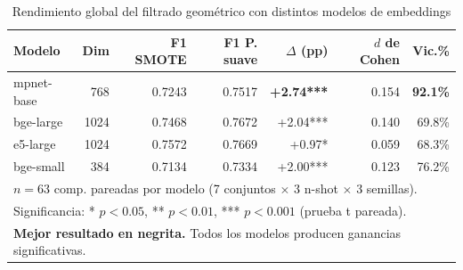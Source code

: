 \begin{table}[htbp]
\centering
\caption{Rendimiento global del filtrado geométrico con distintos modelos de embeddings}
\label{tab:embedding_overall}
\small
\begin{tabular}{lrrrrrr}
\toprule
\textbf{Modelo} & \textbf{Dim} & \textbf{F1 SMOTE} & \textbf{F1 P. suave} & \textbf{$\Delta$ (pp)} & \textbf{$d$ de Cohen} & \textbf{Vic.\%} \\
\midrule
mpnet-base     & 768  & 0.7243 & 0.7517 & \textbf{+2.74***} & 0.154 & \textbf{92.1\%} \\
bge-large      & 1024 & 0.7468 & 0.7672 & +2.04***          & 0.140 & 69.8\%          \\
e5-large       & 1024 & 0.7572 & 0.7669 & +0.97*            & 0.059 & 68.3\%          \\
bge-small      & 384  & 0.7134 & 0.7334 & +2.00***          & 0.123 & 76.2\%          \\
\midrule
\multicolumn{7}{l}{\small $n=63$ comp. pareadas por modelo (7 conjuntos $\times$ 3 n-shot $\times$ 3 semillas).} \\
\multicolumn{7}{l}{\small Significancia: * $p<0.05$, ** $p<0.01$, *** $p<0.001$ (prueba t pareada).} \\
\multicolumn{7}{l}{\small \textbf{Mejor resultado en negrita.} Todos los modelos producen ganancias significativas.} \\
\bottomrule
\end{tabular}
\end{table}
